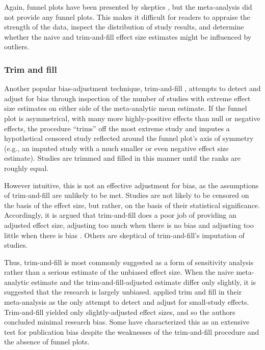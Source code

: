 \documentclass[man]{apa6}
\begin{document}
Again, funnel plots have been presented by skeptics \citep[e.g.,][]{Ferguson:2007}, but the \citet{Anderson:etal:2010} meta-analysis did not provide any funnel plots. This makes it difficult for readers to appraise the strength of the data, inspect the distribution of study results, and determine whether the naive and trim-and-fill effect size estimates might be influenced by outliers.

\subsubsection{Trim and fill}
Another popular bias-adjustment technique, trim-and-fill \citep{Duval:Tweedie:2000}, attempts to detect and adjust for bias through inspection of the number of studies with extreme effect size estimates on either side of the meta-analytic mean estimate. If the funnel plot is asymmetrical, with many more highly-positive effects than null or negative effects, the procedure ``trims'' off the most extreme study and imputes a hypothetical censored study reflected around the funnel plot's axis of symmetry (e.g., an imputed study with a much smaller or even negative effect size estimate). Studies are trimmed and filled in this manner until the ranks are roughly equal. 

However intuitive, this is not an effective adjustment for bias, as the assumptions of trim-and-fill are unlikely to be met. Studies are not likely to be censored on the basis of the effect size, but rather, on the basis of their statistical significance. Accordingly, it is argued that trim-and-fill does a poor job of providing an adjusted effect size, adjusting too much when there is no bias and adjusting too little when there is bias \citep{Lakens:2014,Simonsohn:etal:2014b}. %
Others are skeptical of trim-and-fill's imputation of studies. %

Thus, trim-and-fill is most commonly suggested as a form of sensitivity analysis rather than a serious estimate of the unbiased effect size. When the naive meta-analytic estimate and the trim-and-fill-adjusted estimate differ only slightly, it is suggested that the research is largely unbiased.
\citet{Anderson:etal:2010} applied trim and fill in their meta-analysis as the only attempt to detect and adjust for small-study effects. Trim-and-fill yielded only slightly-adjusted effect sizes, and so the authors concluded minimal research bias.  %
Some have characterized this as an extensive test for publication bias \citep[][pg. 51]{Bushman:Huesmann:2014} despite the weaknesses of the trim-and-fill procedure and the absence of funnel plots.
\end{document}
